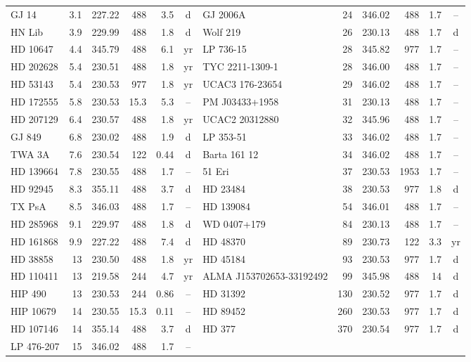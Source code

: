 \begin{tabular}{@{}l@{\hspace{5pt}}r@{\hspace{5pt}}r@{\hspace{5pt}}r@{\hspace{5pt}}r@{\hspace{5pt}}c@{\hspace{12pt}}l@{\hspace{5pt}}r@{\hspace{5pt}}r@{\hspace{5pt}}r@{\hspace{5pt}}r@{\hspace{5pt}}c@{}}
GJ 14 & 3.1 & 227.22 & 488 & 3.5 & d & GJ 2006A & 24 & 346.02 & 488 & 1.7 & -- \\
HN Lib & 3.9 & 229.99 & 488 & 1.8 & d & Wolf 219 & 26 & 230.13 & 488 & 1.7 & d \\
HD 10647 & 4.4 & 345.79 & 488 & 6.1 & yr & LP 736-15 & 28 & 345.82 & 977 & 1.7 & -- \\
HD 202628 & 5.4 & 230.51 & 488 & 1.8 & yr & TYC 2211-1309-1 & 28 & 346.00 & 488 & 1.7 & -- \\
HD 53143 & 5.4 & 230.53 & 977 & 1.8 & yr & UCAC3 176-23654 & 29 & 346.02 & 488 & 1.7 & -- \\
HD 172555 & 5.8 & 230.53 & 15.3 & 5.3 & -- & PM J03433+1958 & 31 & 230.13 & 488 & 1.7 & -- \\
HD 207129 & 6.4 & 230.57 & 488 & 1.8 & yr & UCAC2 20312880 & 32 & 345.96 & 488 & 1.7 & -- \\
GJ 849 & 6.8 & 230.02 & 488 & 1.9 & d & LP 353-51 & 33 & 346.02 & 488 & 1.7 & -- \\
TWA 3A & 7.6 & 230.54 & 122 & 0.44 & d & Barta 161 12 & 34 & 346.02 & 488 & 1.7 & -- \\
HD 139664 & 7.8 & 230.55 & 488 & 1.7 & -- & 51 Eri & 37 & 230.53 & 1953 & 1.7 & -- \\
HD 92945 & 8.3 & 355.11 & 488 & 3.7 & d & HD 23484 & 38 & 230.53 & 977 & 1.8 & d \\
TX PsA & 8.5 & 346.03 & 488 & 1.7 & -- & HD 139084 & 54 & 346.01 & 488 & 1.7 & -- \\
HD 285968 & 9.1 & 229.97 & 488 & 1.8 & d & WD 0407+179 & 84 & 230.13 & 488 & 1.7 & -- \\
HD 161868 & 9.9 & 227.22 & 488 & 7.4 & d & HD 48370 & 89 & 230.73 & 122 & 3.3 & yr \\
HD 38858 & 13 & 230.50 & 488 & 1.8 & yr & HD 45184 & 93 & 230.53 & 977 & 1.7 & d \\
HD 110411 & 13 & 219.58 & 244 & 4.7 & yr & ALMA J153702653-33192492 & 99 & 345.98 & 488 & 14 & d \\
HIP 490 & 13 & 230.53 & 244 & 0.86 & -- & HD 31392 & 130 & 230.52 & 977 & 1.7 & d \\
HIP 10679 & 14 & 230.55 & 15.3 & 0.11 & -- & HD 89452 & 260 & 230.53 & 977 & 1.7 & d \\
HD 107146 & 14 & 355.14 & 488 & 3.7 & d & HD 377 & 370 & 230.54 & 977 & 1.7 & d \\
LP 476-207 & 15 & 346.02 & 488 & 1.7 & -- &  &  &  &  &  &  \\
\hline
\end{tabular}
